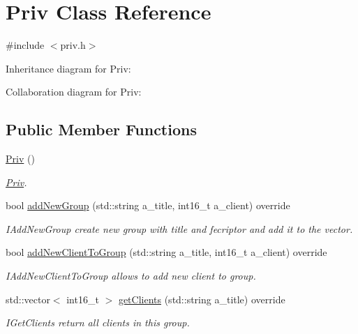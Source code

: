 \hypertarget{classPriv}{}\section{Priv Class Reference}
\label{classPriv}


{\ttfamily \#include $<$priv.\+h$>$}



Inheritance diagram for Priv\+:


Collaboration diagram for Priv\+:
\subsection*{Public Member Functions}
\begin{DoxyCompactItemize}
\item 
\hyperlink{classPriv_aadda11dccbb01f14e40797a4a3f62169}{Priv} ()\hypertarget{classPriv_aadda11dccbb01f14e40797a4a3f62169}{}\label{classPriv_aadda11dccbb01f14e40797a4a3f62169}

\begin{DoxyCompactList}\small\item\em \hyperlink{classPriv}{Priv}. \end{DoxyCompactList}\item 
bool \hyperlink{classPriv_a2f78f6d91c15f1a94b92dd02b9864bc8}{add\+New\+Group} (std\+::string a\+\_\+title, int16\+\_\+t a\+\_\+client) override
\begin{DoxyCompactList}\small\item\em I\+Add\+New\+Group create new group with title and fecriptor and add it to the vector. \end{DoxyCompactList}\item 
bool \hyperlink{classPriv_a5705b5ca03a54985811290807d92e8ef}{add\+New\+Client\+To\+Group} (std\+::string a\+\_\+title, int16\+\_\+t a\+\_\+client) override
\begin{DoxyCompactList}\small\item\em I\+Add\+New\+Client\+To\+Group allows to add new client to group. \end{DoxyCompactList}\item 
std\+::vector$<$ int16\+\_\+t $>$ \hyperlink{classPriv_a600d715c89acae9fa329ef46c60b055e}{get\+Clients} (std\+::string a\+\_\+title) override
\begin{DoxyCompactList}\small\item\em I\+Get\+Clients return all clients in this group. \end{DoxyCompactList}\end{DoxyCompactItemize}


